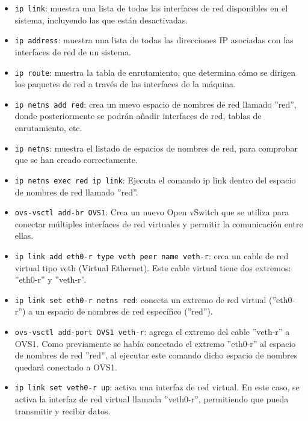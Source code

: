 \documentclass[a4paper, 12pt]{book}
\begin{document}
	\begin{itemize}
		\item \verb*|ip link|: muestra una lista de todas las interfaces de red disponibles en el sistema, incluyendo las que están desactivadas.
		
		\item \verb*|ip address|: muestra una lista de todas las direcciones IP asociadas con las interfaces de red de un sistema.
		
		\item \verb*|ip route|: muestra la tabla de enrutamiento, que determina cómo se dirigen los paquetes de red a través de las interfaces de la máquina.
		
		\item \verb*|ip netns add red|: crea un nuevo espacio de nombres de red llamado ''red'', donde posteriormente se podrán añadir interfaces de red, tablas de enrutamiento, etc. 
		
		\item \verb*|ip netns|: muestra el listado de espacios de nombres de red, para comprobar que se han creado correctamente.
		
		\item \verb*|ip netns exec red ip link|: Ejecuta el comando ip link dentro del espacio de nombres de red llamado ''red''. 
			
		\item \verb*|ovs-vsctl add-br OVS1|: Crea un nuevo Open vSwitch que se utiliza para conectar múltiples interfaces de red virtuales y permitir la comunicación entre ellas. 
				
		\item \verb*|ip link add eth0-r type veth peer name veth-r|:  crea un cable de red virtual tipo veth (Virtual Ethernet). Este cable virtual tiene dos extremos: ''eth0-r'' y ''veth-r''.
		
		\item \verb*|ip link set eth0-r netns red|: conecta un extremo de red virtual (''eth0-r'') a un espacio de nombres de red específico (''red''). 
		
		\item \verb*|ovs-vsctl add-port OVS1 veth-r|: agrega el extremo del cable ''veth-r'' a OVS1. Como previamente se había conectado el extremo ''eth0-r'' al espacio de nombres de red ''red'', al ejecutar este comando dicho espacio de nombres quedará conectado a OVS1.
		
		\item \verb*|ip link set veth0-r up|: activa una interfaz de red virtual. En este caso, se activa la interfaz de red virtual llamada ''veth0-r'', permitiendo que pueda transmitir y recibir datos. 
		

\end{itemize}
\end{document}
